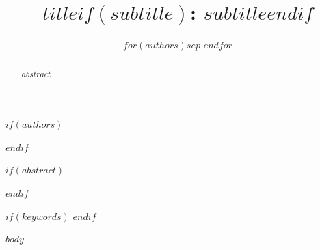 \documentclass{cta-author}
\begin{document}
\title{$title$$if(subtitle)$: $subtitle$$endif$}

\author{$for(authors)$$sep$ $endfor$}

$if(authors)$
\address{$for(authors)$$if(authors.affiliation)$$endif$$endfor$$for(authors)$$if(authors.email)$$endif$$endfor$}
$endif$

$if(abstract)$
\begin{abstract}
$abstract$
\end{abstract}
$endif$

$if(keywords)$
$endif$

\maketitle

$body$
\end{document}
